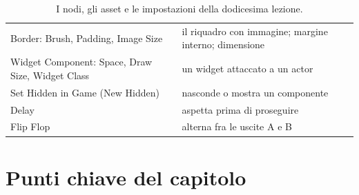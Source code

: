 \begin{table}[htbp]
\begin{tabular}{@{}p{5.8cm}p{8.2cm}@{}}
Border: Brush, Padding, Image Size & il riquadro con immagine; margine interno; dimensione \\
Widget Component: Space, Draw Size, Widget Class & un widget attaccato a un actor \\
Set Hidden in Game (New Hidden) & nasconde o mostra un componente \\
Delay & aspetta prima di proseguire \\
Flip Flop & alterna fra le uscite A e B \\
\bottomrule
\end{tabular}
\caption{I nodi, gli asset e le impostazioni della dodicesima lezione.}
\label{ue12:tab:nodi}
\end{table}

\section*{Punti chiave del capitolo}

